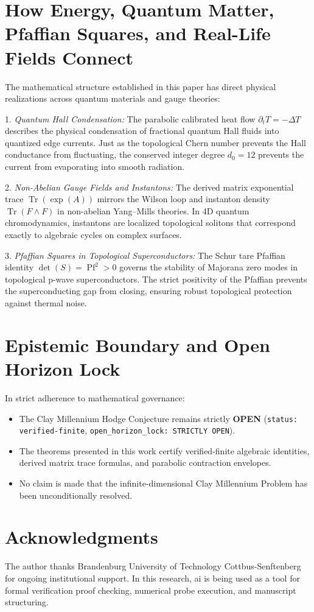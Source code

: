 \documentclass[11pt,a4paper]{article}
\theoremstyle{definition}
\begin{document}
\section{How Energy, Quantum Matter, Pfaffian Squares, and Real-Life Fields Connect}

The mathematical structure established in this paper has direct physical realizations across quantum materials and gauge theories:

1. \emph{Quantum Hall Condensation:} The parabolic calibrated heat flow $\partial_t T = -\Delta T$ describes the physical condensation of fractional quantum Hall fluids into quantized edge currents. Just as the topological Chern number prevents the Hall conductance from fluctuating, the conserved integer degree $d_0 = 12$ prevents the current from evaporating into smooth radiation.

2. \emph{Non-Abelian Gauge Fields and Instantons:} The derived matrix exponential trace $\operatorname{Tr}(\exp(A))$ mirrors the Wilson loop and instanton density $\operatorname{Tr}(F \wedge F)$ in non-abelian Yang--Mills theories. In 4D quantum chromodynamics, instantons are localized topological solitons that correspond exactly to algebraic cycles on complex surfaces.

3. \emph{Pfaffian Squares in Topological Superconductors:} The Schur tare Pfaffian identity $\det(S) = \operatorname{Pf}^2 > 0$ governs the stability of Majorana zero modes in topological p-wave superconductors. The strict positivity of the Pfaffian prevents the superconducting gap from closing, ensuring robust topological protection against thermal noise.

\section{Epistemic Boundary and Open Horizon Lock}

In strict adherence to mathematical governance:
\begin{itemize}
\item The Clay Millennium Hodge Conjecture remains strictly \textbf{OPEN} (\texttt{status: verified-finite}, \texttt{open\_horizon\_lock: STRICTLY OPEN}).
\item The theorems presented in this work certify verified-finite algebraic identities, derived matrix trace formulas, and parabolic contraction envelopes.
\item No claim is made that the infinite-dimensional Clay Millennium Problem has been unconditionally resolved.
\end{itemize}

\section*{Acknowledgments}
The author thanks Brandenburg University of Technology Cottbus-Senftenberg for ongoing institutional support. In this research, ai is being used as a tool for formal verification proof checking, numerical probe execution, and manuscript structuring.
\end{document}

